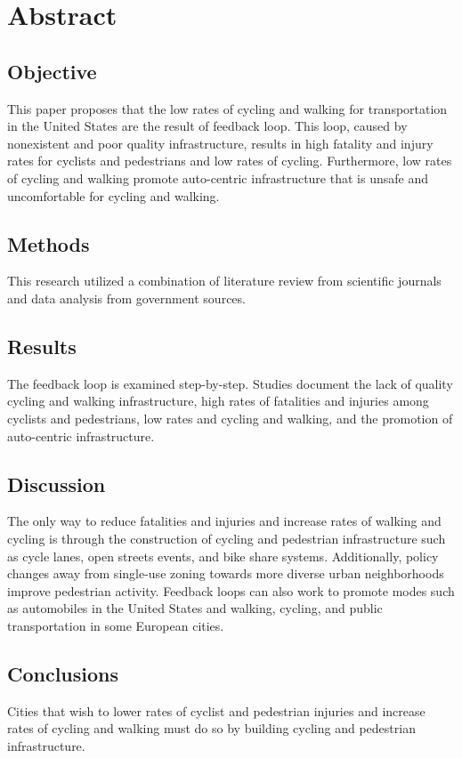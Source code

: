 \documentclass{article}
\begin{document}

\section*{Abstract}
\subsection*{Objective}
This paper proposes that the low rates of cycling and walking for transportation in the United States are the result of feedback loop. This loop, caused by nonexistent and poor quality infrastructure, results in high fatality and injury rates for cyclists and pedestrians and low rates of cycling. Furthermore, low rates of cycling and walking promote auto-centric infrastructure that is unsafe and uncomfortable for cycling and walking.
\subsection*{Methods}
This research utilized a combination of literature review from scientific journals and data analysis from government sources. 
\subsection*{Results}
The feedback loop is examined step-by-step. Studies document the lack of quality cycling and walking infrastructure, high rates of fatalities and injuries among cyclists and pedestrians, low rates and cycling and walking, and the promotion of auto-centric infrastructure.
\subsection*{Discussion}
The only way to reduce fatalities and injuries and increase rates of walking and cycling is through the construction of cycling and pedestrian infrastructure such as cycle lanes, open streets events, and bike share systems. Additionally, policy changes away from single-use zoning towards more diverse urban neighborhoods improve pedestrian activity. Feedback loops can also work to promote modes such as automobiles in the United States and walking, cycling, and public transportation in some European cities.
\subsection*{Conclusions}
Cities that wish to lower rates of cyclist and pedestrian injuries and increase rates of cycling and walking must do so by building cycling and pedestrian infrastructure.
\end{document}
